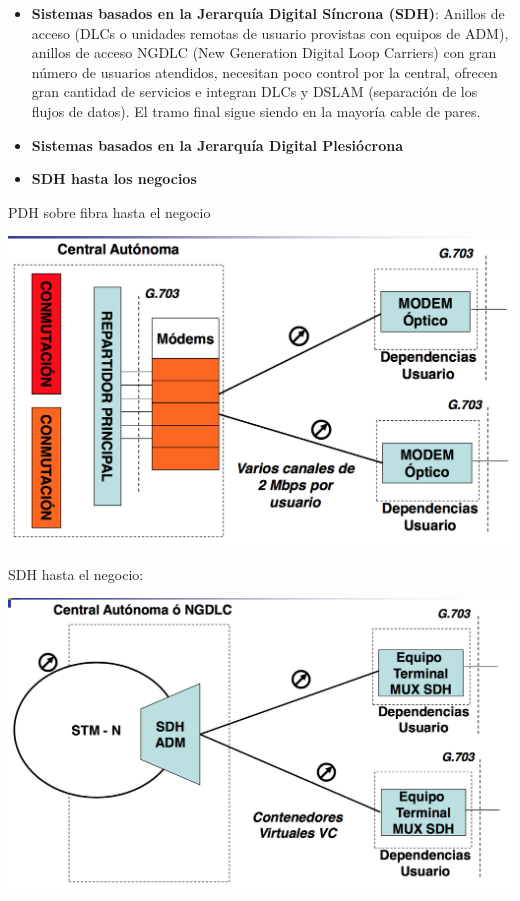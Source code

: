 \documentclass[10pt,portrait, twocolumn]{article}
\begin{document}
	\begin{itemize}
		\item \textbf{Sistemas basados en la Jerarquía Digital Síncrona (SDH)}: Anillos de acceso (DLCs o unidades remotas de usuario provistas con equipos de ADM), anillos de acceso NGDLC (New Generation Digital Loop Carriers) con gran número de usuarios atendidos, necesitan poco control por la central, ofrecen gran cantidad de servicios e integran DLCs y DSLAM (separación de los flujos de datos). El tramo final sigue siendo en la mayoría cable de pares.
		\item \textbf{Sistemas basados en la Jerarquía Digital Plesiócrona}
		\item \textbf{SDH hasta los negocios}
	\end{itemize}

PDH sobre fibra hasta el negocio

	\begin{center}
		\includegraphics[scale=0.2]{images/PDHSobreFibra}
	\end{center}

SDH hasta el negocio:

	\begin{center}
		\includegraphics[scale=0.2]{images/SDHNegocio}
	\end{center}
	
\end{document}
